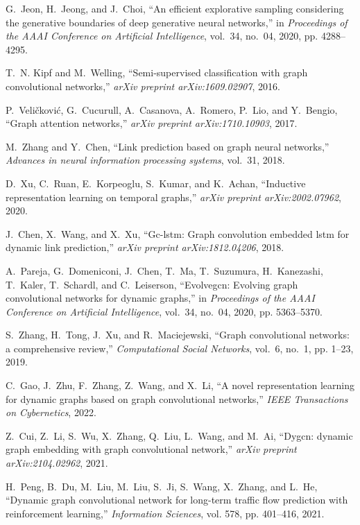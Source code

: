 \documentclass[conference]{IEEEtran}
\begin{document}
\begin{thebibliography}{00}
G.~Jeon, H.~Jeong, and J.~Choi, ``An efficient explorative sampling considering
the generative boundaries of deep generative neural networks,'' in
\emph{Proceedings of the AAAI Conference on Artificial Intelligence},
vol.~34, no.~04, 2020, pp. 4288--4295.

T.~N. Kipf and M.~Welling, ``Semi-supervised classification with graph
convolutional networks,'' \emph{arXiv preprint arXiv:1609.02907}, 2016.

P.~Veli{\v{c}}kovi{\'c}, G.~Cucurull, A.~Casanova, A.~Romero, P.~Lio, and
Y.~Bengio, ``Graph attention networks,'' \emph{arXiv preprint
	arXiv:1710.10903}, 2017.

M.~Zhang and Y.~Chen, ``Link prediction based on graph neural networks,''
\emph{Advances in neural information processing systems}, vol.~31, 2018.

D.~Xu, C.~Ruan, E.~Korpeoglu, S.~Kumar, and K.~Achan, ``Inductive
representation learning on temporal graphs,'' \emph{arXiv preprint
	arXiv:2002.07962}, 2020.

J.~Chen, X.~Wang, and X.~Xu, ``Gc-lstm: Graph convolution embedded lstm for
dynamic link prediction,'' \emph{arXiv preprint arXiv:1812.04206}, 2018.

A.~Pareja, G.~Domeniconi, J.~Chen, T.~Ma, T.~Suzumura, H.~Kanezashi, T.~Kaler,
T.~Schardl, and C.~Leiserson, ``Evolvegcn: Evolving graph convolutional
networks for dynamic graphs,'' in \emph{Proceedings of the AAAI Conference on
	Artificial Intelligence}, vol.~34, no.~04, 2020, pp. 5363--5370.

S.~Zhang, H.~Tong, J.~Xu, and R.~Maciejewski, ``Graph convolutional networks: a
comprehensive review,'' \emph{Computational Social Networks}, vol.~6, no.~1,
pp. 1--23, 2019.

C.~Gao, J.~Zhu, F.~Zhang, Z.~Wang, and X.~Li, ``A novel representation learning
for dynamic graphs based on graph convolutional networks,'' \emph{IEEE
	Transactions on Cybernetics}, 2022.

Z.~Cui, Z.~Li, S.~Wu, X.~Zhang, Q.~Liu, L.~Wang, and M.~Ai, ``Dygcn: dynamic
graph embedding with graph convolutional network,'' \emph{arXiv preprint
	arXiv:2104.02962}, 2021.

H.~Peng, B.~Du, M.~Liu, M.~Liu, S.~Ji, S.~Wang, X.~Zhang, and L.~He, ``Dynamic
graph convolutional network for long-term traffic flow prediction with
reinforcement learning,'' \emph{Information Sciences}, vol. 578, pp.
401--416, 2021.


\end{thebibliography}
\end{document}
